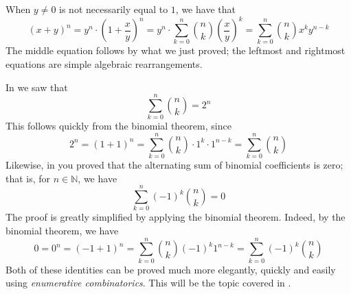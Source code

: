 \begin{cproof}
When $y \ne 0$ is not necessarily equal to $1$, we have that
\[ (x+y)^n = y^n \cdot \left( 1 + \frac{x}{y} \right)^n = y^n \cdot \sum_{k=0}^n \binom{n}{k} \left( \frac{x}{y} \right)^k = \sum_{k=0}^n \binom{n}{k} x^k y^{n-k} \]
The middle equation follows by what we just proved; the leftmost and rightmost equations are simple algebraic rearrangements.
\end{cproof}

\begin{example}
In  we saw that
\[ \sum_{k=0}^n \binom{n}{k} = 2^n \]
This follows quickly from the binomial theorem, since
\[ 2^n = (1+1)^n = \sum_{k=0}^n \binom{n}{k} \cdot 1^k \cdot 1^{n-k} = \sum_{k=0}^n \binom{n}{k} \]
Likewise, in  you proved that the alternating sum of binomial coefficients is zero; that is, for $n \in \mathbb{N}$, we have
\[ \sum_{k=0}^n (-1)^k \binom{n}{k} = 0 \]
The proof is greatly simplified by applying the binomial theorem. Indeed, by the binomial theorem, we have
\[ 0 = 0^n = (-1+1)^n = \sum_{k=0}^n \binom{n}{k}(-1)^k1^{n-k} = \sum_{k=0}^n (-1)^k \binom{n}{k} \]
Both of these identities can be proved much more elegantly, quickly and easily using \textit{enumerative combinatorics}. This will be the topic covered in .
\end{example}

